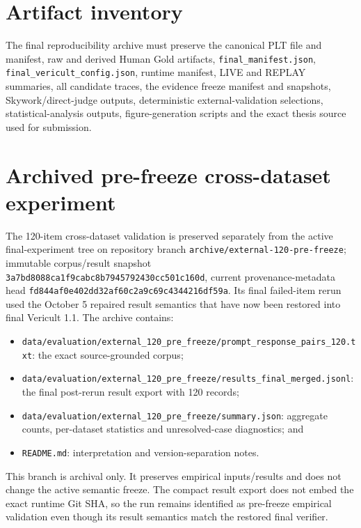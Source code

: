 \section*{Artifact inventory}

The final reproducibility archive must preserve the canonical PLT file and manifest, raw and derived Human Gold artifacts, \texttt{final\_manifest.json}, \texttt{final\_vericult\_config.json}, runtime manifest, LIVE and REPLAY summaries, all candidate traces, the evidence freeze manifest and snapshots, Skywork/direct-judge outputs, deterministic external-validation selections, statistical-analysis outputs, figure-generation scripts and the exact thesis source used for submission.

\section*{Archived pre-freeze cross-dataset experiment}

The 120-item cross-dataset validation is preserved separately from the active final-experiment tree on repository branch \texttt{archive/external-120-pre-freeze}; immutable corpus/result snapshot \texttt{3a7bd8088ca1f9cabc8b7945792430cc501c160d}, current provenance-metadata head \texttt{fd844af0e402dd32af60c2a9c69c4344216df59a}. Its final failed-item rerun used the October 5 repaired result semantics that have now been restored into final Vericult 1.1. The archive contains:

\begin{itemize}
    \item \texttt{data/evaluation/external\_120\_pre\_freeze/prompt\_response\_pairs\_120.txt}: the exact source-grounded corpus;
    \item \texttt{data/evaluation/external\_120\_pre\_freeze/results\_final\_merged.jsonl}: the final post-rerun result export with 120 records;
    \item \texttt{data/evaluation/external\_120\_pre\_freeze/summary.json}: aggregate counts, per-dataset statistics and unresolved-case diagnostics; and
    \item \texttt{README.md}: interpretation and version-separation notes.
\end{itemize}

This branch is archival only. It preserves empirical inputs/results and does not change the active semantic freeze. The compact result export does not embed the exact runtime Git SHA, so the run remains identified as pre-freeze empirical validation even though its result semantics match the restored final verifier.
